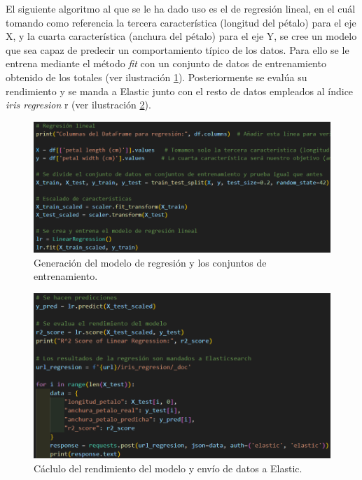 El siguiente algoritmo al que se le ha dado uso es el de regresión lineal, en el cuál tomando como referencia la tercera característica (longitud del pétalo) para el eje X, y la cuarta característica (anchura del pétalo) para el eje Y, se cree un modelo que sea capaz de predecir un comportamiento típico de los datos. Para ello se le entrena mediante el método \textit{fit} con un conjunto de datos de entrenamiento obtenido de los totales  (ver ilustración  \ref{fig:regresion1}). Posteriormente se evalúa su rendimiento y se manda a Elastic junto con el resto de datos empleados al índice \textit{iris regresion} r  (ver ilustración  \ref{fig:regresion2}).
\begin{figure}
    \centering
    \includegraphics[width=1\linewidth]{img/iris8.png}
    \caption{Generación del modelo de regresión y los conjuntos de entrenamiento.}
    \label{fig:regresion1}
\end{figure}


\begin{figure}
    \centering
    \includegraphics[width=1\linewidth]{img/iris9.png}
    \caption{Cáclulo del rendimiento del modelo y envío de datos a Elastic.}
    \label{fig:regresion2}
\end{figure}


